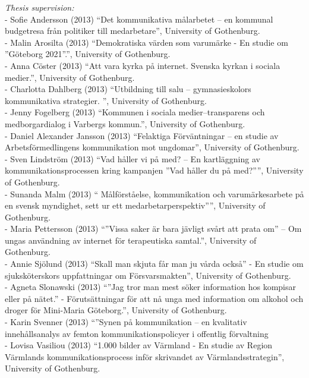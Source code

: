 \documentclass[a4paper,11pt,oneside]{article}
\begin{document}
{             \noindent \emph{Thesis supervision:} \\
             - Sofie Andersson (2013) ``Det kommunikativa målarbetet – en kommunal budgetresa från politiker till medarbetare'', University of Gothenburg.\\
             - Malin Arosilta (2013) ``Demokratiska värden som varumärke - En studie om ''Göteborg 2021''.'', University of Gothenburg.\\
             - Anna Cöster (2013) ``Att vara kyrka på internet. Svenska kyrkan i sociala medier.'', University of Gothenburg.\\
             - Charlotta Dahlberg (2013) ``Utbildning till salu – gymnasieskolors kommunikativa strategier. '', University of Gothenburg.\\
             - Jenny Fogelberg (2013) ``Kommunen i sociala medier–transparens och medborgardialog i Varbergs kommun.'', University of Gothenburg.\\
             - Daniel Alexander Jansson (2013) ``Felaktiga Förväntningar – en studie av Arbetsförmedlingens kommunikation mot ungdomar'', University of Gothenburg.\\
             - Sven Lindström (2013) ``Vad håller vi på med? – En kartläggning av kommunikationsprocessen kring kampanjen ”Vad håller du på med?”'', University of Gothenburg.\\
             - Sunanda Malm (2013) `` Målförståelse, kommunikation och varumärkesarbete på en svensk myndighet, sett ur ett medarbetarperspektiv'''', University of Gothenburg.\\
             - Maria Pettersson (2013) ``''Vissa saker är bara jävligt svårt att prata om'' – Om ungas användning av internet för terapeutiska samtal.'', University of Gothenburg.\\
             - Annie Sjölund (2013) ``Skall man skjuta får man ju vårda också'' - En studie om sjuksköterskors uppfattningar om Försvarsmakten'', University of Gothenburg.\\
             - Agneta Slonawski (2013) ``”Jag tror man mest söker information hos kompisar eller på nätet.” - Förutsättningar för att nå unga med information om alkohol och droger för Mini-Maria Göteborg.'', University of Gothenburg.\\
             - Karin Svenner (2013) ``''Synen på kommunikation – en kvalitativ innehållsanalys av femton kommunikationspolicyer i offentlig förvaltning\\
             - Lovisa Vasiliou (2013) ``1.000 bilder av Värmland - En studie av Region Värmlands kommunikationsprocess inför skrivandet av Värmlandsstrategin'', University of Gothenburg.\\
}
\end{document}
